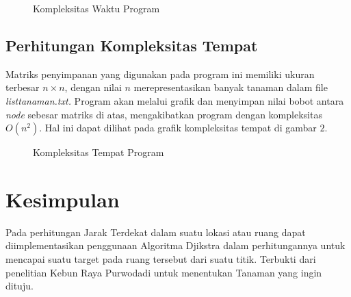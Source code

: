 \documentclass[conference]{IEEEtran}
\begin{document}
    \begin{figure}[H]
        \centering
        \scalebox{0.42}{}
        \caption{Kompleksitas Waktu Program}
    \end{figure}

\subsection{Perhitungan Kompleksitas Tempat}
    Matriks penyimpanan yang digunakan pada program ini
    memiliki ukuran terbesar $n \times n$, dengan nilai $n$ merepresentasikan
    banyak tanaman dalam file \textit{listtanaman.txt.} Program
    akan melalui grafik dan menyimpan nilai bobot antara \textit{node}
    sebesar matriks di atas, mengakibatkan program dengan kompleksitas
    $O(n^2)$. Hal ini dapat dilihat pada grafik kompleksitas
    tempat di gambar $2$.

    \begin{figure}[H]
        \centering
        \scalebox{0.42}{}
        \caption{Kompleksitas Tempat Program}
    \end{figure}
    
\section{Kesimpulan}
    Pada perhitungan Jarak Terdekat dalam suatu lokasi atau ruang
    dapat diimplementasikan penggunaan Algoritma Djikstra
    dalam perhitungannya untuk mencapai suatu target pada ruang
    tersebut dari suatu titik. Terbukti dari penelitian Kebun Raya
    Purwodadi untuk menentukan Tanaman yang ingin dituju.




\end{document}
